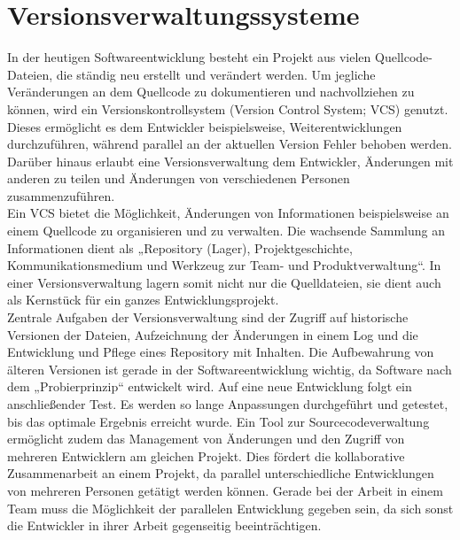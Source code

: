 \section{Versionsverwaltungssysteme}\label{vcs}
In der heutigen Softwareentwicklung besteht ein Projekt aus vielen Quellcode-Dateien, die ständig neu erstellt und verändert werden. Um jegliche Veränderungen an dem Quellcode zu dokumentieren und nachvollziehen zu können, wird ein Versionskontrollsystem (Version Control System; VCS) genutzt.\autocite[Vgl.][S.6]{Baerisch.2005}  
Dieses ermöglicht es dem Entwickler beispielsweise, Weiterentwicklungen durchzuführen, während parallel an der aktuellen Version Fehler behoben werden. Darüber hinaus erlaubt eine Versionsverwaltung dem Entwickler, Änderungen mit anderen zu teilen und Änderungen von verschiedenen Personen zusammenzuführen.\autocite[Vgl.][S.9]{Kleine.2012} \\
Ein VCS bietet die Möglichkeit, Änderungen von Informationen beispielsweise an einem Quellcode zu organisieren und zu verwalten. \autocite[Vgl.][S.1]{Pilato.2009}
Die wachsende Sammlung an Informationen dient als „Repository (Lager), Projektgeschichte, Kommunikationsmedium und Werkzeug zur Team- und Produktverwaltung“.\autocite[][S.1]{Loeliger.2010} In einer Versionsverwaltung lagern somit nicht nur die Quelldateien, sie dient auch als Kernstück für ein ganzes Entwicklungsprojekt. \\
Zentrale Aufgaben der Versionsverwaltung sind der Zugriff auf historische Versionen der Dateien, Aufzeichnung der Änderungen in einem Log und die Entwicklung und Pflege eines Repository mit Inhalten. Die Aufbewahrung von älteren Versionen ist gerade in der Softwareentwicklung wichtig, da Software nach dem „Probierprinzip“\autocite[][S.9]{Versteegen.2003} entwickelt wird. Auf eine neue Entwicklung folgt ein anschließender Test. Es werden so lange Anpassungen durchgeführt und getestet, bis das optimale Ergebnis erreicht wurde.\autocite[Vgl.][S.9]{Versteegen.2003}
Ein Tool zur Sourcecodeverwaltung ermöglicht zudem das Management von Änderungen und den Zugriff von mehreren Entwicklern am gleichen Projekt.\autocite[Vgl.][S.1]{Loeliger.2010} Dies fördert die kollaborative Zusammenarbeit an einem Projekt, da parallel unterschiedliche Entwicklungen von mehreren Personen getätigt werden können. Gerade bei der Arbeit in einem Team muss die Möglichkeit der parallelen Entwicklung gegeben sein, da sich sonst die Entwickler in ihrer Arbeit gegenseitig beeinträchtigen.
